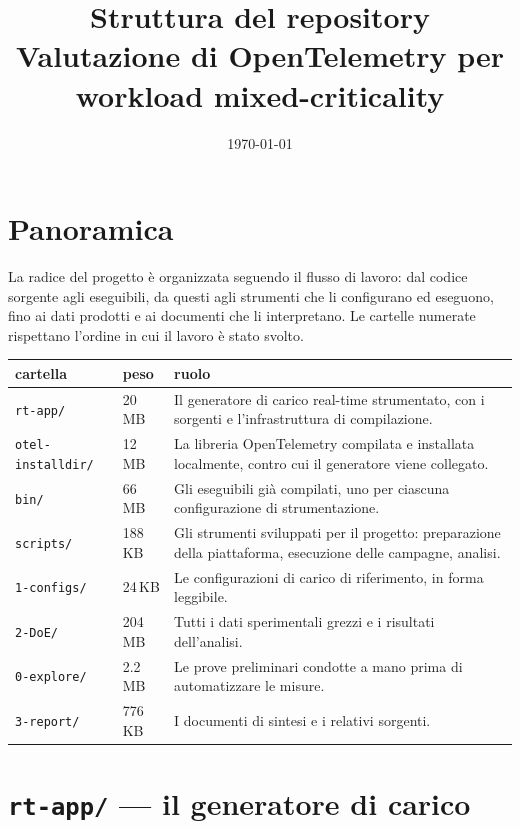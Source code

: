 \documentclass[11pt,a4paper]{article}
\title{\vspace{-1.6cm}\textbf{Struttura del repository}\\[.2em]
\large Valutazione di OpenTelemetry per workload mixed-criticality}
\author{}
\date{\today}
\begin{document}
\maketitle
\vspace{-1.4cm}

\section*{Panoramica}

La radice del progetto \`e organizzata seguendo il flusso di lavoro: dal codice sorgente agli
eseguibili, da questi agli strumenti che li configurano ed eseguono, fino ai dati prodotti e ai
documenti che li interpretano. Le cartelle numerate rispettano l'ordine in cui il lavoro \`e stato
svolto.

\begin{center}\small
\begin{tabular}{p{3.1cm}p{1.3cm}p{9.9cm}}
\toprule
\textbf{cartella} & \textbf{peso} & \textbf{ruolo} \\
\midrule
\texttt{rt-app/} & 20\,MB & Il generatore di carico real-time strumentato, con i sorgenti e l'infrastruttura di compilazione. \\
\texttt{otel-installdir/} & 12\,MB & La libreria OpenTelemetry compilata e installata localmente, contro cui il generatore viene collegato. \\
\texttt{bin/} & 66\,MB & Gli eseguibili gi\`a compilati, uno per ciascuna configurazione di strumentazione. \\
\texttt{scripts/} & 188\,KB & Gli strumenti sviluppati per il progetto: preparazione della piattaforma, esecuzione delle campagne, analisi. \\
\texttt{1-configs/} & 24\,KB & Le configurazioni di carico di riferimento, in forma leggibile. \\
\texttt{2-DoE/} & 204\,MB & Tutti i dati sperimentali grezzi e i risultati dell'analisi. \\
\texttt{0-explore/} & 2.2\,MB & Le prove preliminari condotte a mano prima di automatizzare le misure. \\
\texttt{3-report/} & 776\,KB & I documenti di sintesi e i relativi sorgenti. \\
\bottomrule
\end{tabular}
\end{center}

\vspace{-.4em}
\section{\texttt{rt-app/} --- il generatore di carico}
\end{document}
